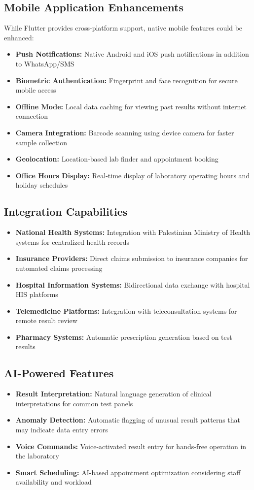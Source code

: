 \documentclass[12pt, a4paper]{report}
\begin{document}
\subsection{Mobile Application Enhancements}
While Flutter provides cross-platform support, native mobile features could be enhanced:
\begin{itemize}
    \item \textbf{Push Notifications:} Native Android and iOS push notifications in addition to WhatsApp/SMS
    \item \textbf{Biometric Authentication:} Fingerprint and face recognition for secure mobile access
    \item \textbf{Offline Mode:} Local data caching for viewing past results without internet connection
    \item \textbf{Camera Integration:} Barcode scanning using device camera for faster sample collection
    \item \textbf{Geolocation:} Location-based lab finder and appointment booking
    \item \textbf{Office Hours Display:} Real-time display of laboratory operating hours and holiday schedules
\end{itemize}

\subsection{Integration Capabilities}
\begin{itemize}
    \item \textbf{National Health Systems:} Integration with Palestinian Ministry of Health systems for centralized health records
    \item \textbf{Insurance Providers:} Direct claims submission to insurance companies for automated claims processing
    \item \textbf{Hospital Information Systems:} Bidirectional data exchange with hospital HIS platforms
    \item \textbf{Telemedicine Platforms:} Integration with teleconsultation systems for remote result review
    \item \textbf{Pharmacy Systems:} Automatic prescription generation based on test results
\end{itemize}

\subsection{AI-Powered Features}
\begin{itemize}
    \item \textbf{Result Interpretation:} Natural language generation of clinical interpretations for common test panels
    \item \textbf{Anomaly Detection:} Automatic flagging of unusual result patterns that may indicate data entry errors
    \item \textbf{Voice Commands:} Voice-activated result entry for hands-free operation in the laboratory
    \item \textbf{Smart Scheduling:} AI-based appointment optimization considering staff availability and workload
\end{itemize}
\end{document}
